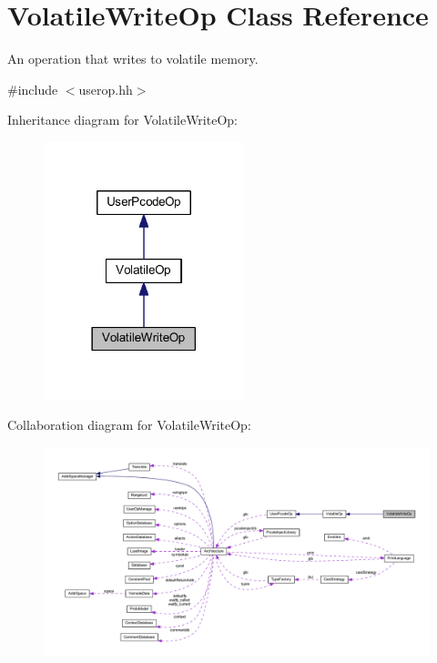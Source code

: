 \hypertarget{class_volatile_write_op}{}\section{Volatile\+Write\+Op Class Reference}
\label{class_volatile_write_op}


An operation that writes to volatile memory.  




{\ttfamily \#include $<$userop.\+hh$>$}



Inheritance diagram for Volatile\+Write\+Op\+:
\nopagebreak
\begin{figure}[H]
\begin{center}
\leavevmode
\includegraphics[width=165pt]{class_volatile_write_op__inherit__graph}
\end{center}
\end{figure}


Collaboration diagram for Volatile\+Write\+Op\+:
\nopagebreak
\begin{figure}[H]
\begin{center}
\leavevmode
\includegraphics[width=350pt]{class_volatile_write_op__coll__graph}
\end{center}
\end{figure}
